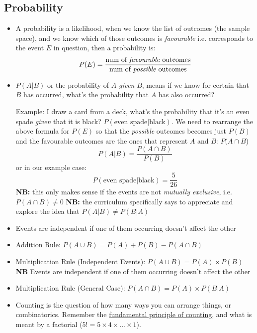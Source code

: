 \documentclass[10pt,a4paper]{article}
\newcommand{\NB}[1]{\textcolor{blumb}{\textbf{NB: }}}
\begin{document}
\subsection{Probability}

\begin{itemize}
     
    \item A probability is a likelihood, when we know the list of outcomes (the sample space), and we know which of those outcomes is \textit{favourable} i.e.          corresponds to the event $E$ in question, then a probability is: 
            \begin{equation}
                P(E) = \frac{\text{num of \textit{favourable} outcomes}}{\text{num of \textit{possible} outcomes}}
            \end{equation}
            \item $P(A | B)$ or the probability of $A$ \textit{given} $B$, means if we know for certain that $B$ has occurred, what's the probability that $A$ has also occurred?
           
            \textcolor{blumb}{Example:}
            I draw a card from a deck, what's the probability that it's an even spade \textit{given} that it is black? $P(\text{even spade}|\text{black})$. We need to rearrange the above formula for $P(E)$ so that the \textit{possible} outcomes becomes just $P(B)$ and the favourable outcomes are the ones that represent $A$ and $B$: $P(A \cap B$)
            \begin{equation}
                P(A|B)=\frac{P(A\cap B)}{P(B)}
            \end{equation}
            or in our example case: 
            \begin{equation}
                P(\text{even spade}|\text{black})=\frac{5}{26}
            \end{equation}
            \NB{} this only makes sense if the events are not \textit{mutually exclusive}, i.e. $P(A\cap B) \neq 0$
            \NB{} the curriculum specifically says to appreciate and explore the idea that $P(A | B) \neq P(B | A)$
    \item Events are independent if one of them occurring doesn't affect the other
    \item Addition Rule: $P(A \cup B) = P(A) + P(B) - P(A \cap B)$
    \item Multiplication Rule (Independent Events): $P(A \cup B) = P(A) \times P(B)$ \textcolor{blumb}{\textbf{NB}} Events are independent if one of them occurring doesn't affect the other
    \item Multiplication Rule (General Case): $P(A \cap B) = P(A) \times P(B | A)$
    \item Counting is the question of how many ways you can arrange things, or combinatorics. Remember the \href{https://en.wikipedia.org/wiki/Rule_of_product}{fundamental principle of counting}, and what is meant by a factorial ($5!=5\times 4 \times ... \times 1$). 
    

\end{itemize}
\end{document}

